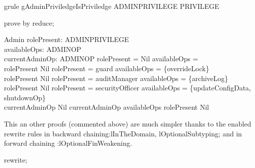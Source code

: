 \begin{theorem}{grule gAdminPriviledgeIsPriviledge}
ADMINPRIVILEGE \in  \power  PRIVILEGE
\end{theorem}

\begin{zproof}[gAdminPriviledgeIsPriviledge]
prove by reduce;
\end{zproof}

\begin{schema}{Admin}
  rolePresent: \Optional ADMINPRIVILEGE\\
  availableOps: \power  ADMINOP\\
  currentAdminOp: \Optional ADMINOP
\where
  rolePresent = Nil \implies  availableOps = \emptyset\\
  rolePresent \neq  Nil \land  \The rolePresent = guard \implies  availableOps = \{overrideLock\}\\
  rolePresent \neq  Nil \land  \The rolePresent = auditManager \implies  availableOps = \{archiveLog\}\\
  rolePresent \neq  Nil \land  \The rolePresent = securityOfficer \implies  availableOps = \{updateConfigData, shutdownOp\}\\
  currentAdminOp \neq  Nil \implies  \The currentAdminOp \in  availableOps \land  rolePresent \neq  Nil
\end{schema}

This an other proofs (commented above) are much simpler thanks to
the enabled rewrite rules in backward chaining:lInTheDomain,
lOptionalSubtyping; and in forward chaining :lOptionalFinWeakening.
%
\begin{zproof}
rewrite;
\end{zproof}

